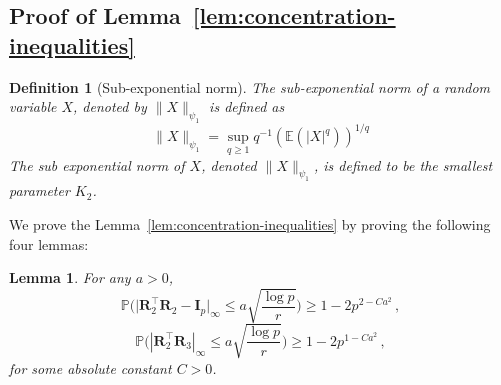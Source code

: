 \documentclass[11pt]{article}
\newtheorem{lemma}{Lemma}%
\newtheorem{definition}{Definition}%
\newcommand{\bI}{\boldsymbol{I}}
\newcommand{\bR}{\boldsymbol{R}}
\newcommand{\Expected}{\mathbb{E}}
\newcommand{\Prob}{\mathbb{P}}
\begin{document}
\subsection{Proof of Lemma~\ref{lem:concentration-inequalities}} \label{pf:concentration-inequalities}

\begin{definition}[Sub-exponential norm]
    The sub-exponential norm of a random variable $X$, denoted by $\|X\|_{\psi_1}$ is defined as
    \[
    \|X\|_{\psi_1}=\sup_{q\ge 1}q^{-1}(\Expected(|X|^q))^{1/q}
    \]
    The sub exponential norm of $X$, denoted $\|X\|_{\psi_1}$, is defined to be the smallest parameter $K_2$.
\end{definition}
We prove the Lemma~\ref{lem:concentration-inequalities} by proving the following four lemmas:
\begin{lemma}\label{lemma:boundR}
    For any $a >0$, 
    \begin{equation}\label{eq:boundR1}
        \Prob\bigg(\big|\bR_2^\top \bR_2 -\bI_p\big|_\infty\leq a\sqrt{\frac{\log p}{r}}\bigg)\geq 1- 2 p^{2-Ca^2}\,,
    \end{equation}
    \begin{equation}\label{eq:boundR2}
        \Prob\bigg(|\bR_2^\top \bR_3|_\infty\leq a\sqrt{\frac{\log p}{r}}\bigg)\geq 1- 2 p^{1-Ca^2}\,,
    \end{equation}
    for some absolute constant $C>0$.
\end{lemma}
\end{document}
